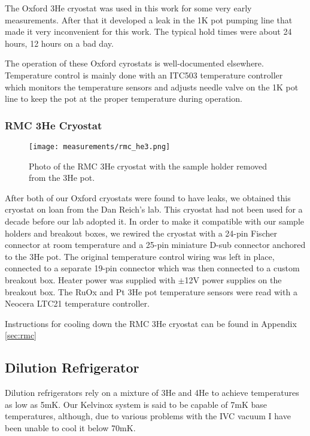 The Oxford 3He cryostat was used in this work for some very early measurements. After that it developed a leak in the 1K pot pumping line that made it very inconvenient for this work. The typical hold times were about 24 hours, 12 hours on a bad day.

The operation of these Oxford cyrostats is well-documented elsewhere. Temperature control is mainly done with an ITC503 temperature controller which monitors the temperature sensors and adjusts needle valve on the 1K pot line to keep the pot at the proper temperature during operation.

\subsubsection*{RMC 3He Cryostat}

\begin{figure}
    \centering
    \texttt{[image: measurements/rmc\_he3.png]}
    \caption{Photo of the RMC 3He cryostat with the sample holder removed from the 3He pot.}
    \label{fig:rmc}
\end{figure}

After both of our Oxford cryostats were found to have leaks, we obtained this cryostat on loan from the Dan Reich's lab. This cryostat had not been used for a decade before our lab adopted it. In order to make it compatible with our sample holders and breakout boxes, we rewired the cryostat with a 24-pin Fischer connector at room temperature and a 25-pin miniature D-sub connector anchored to the 3He pot. The original temperature control wiring was left in place, connected to a separate 19-pin connector which was then connected to a custom breakout box. Heater power was supplied with $\pm$12V power supplies on the breakout box. The RuOx and Pt 3He pot temperature sensors were read with a Neocera LTC21 temperature controller.

Instructions for cooling down the RMC 3He cryostat can be found in Appendix \ref{sec:rmc}

\subsection{Dilution Refrigerator}

Dilution refrigerators rely on a mixture of 3He and 4He to achieve temperatures as low as 5mK. Our Kelvinox system is said to be capable of 7mK base temperatures, although, due to various problems with the IVC vacuum I have been unable to cool it below 70mK.

